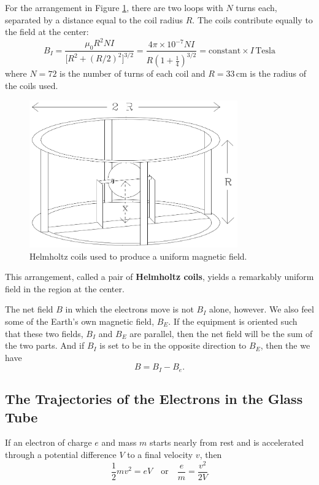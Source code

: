 For the arrangement in Figure {\ref{fig:coils}}, there are two loops with $N$ turns each, separated by a distance equal to the coil radius $R$. The coils contribute equally to the field at the center:
\begin{equation}
  B_{I}=\frac{\mu_{0}R^2NI}{\big[R^2+(R/2)^2\big]^{3/2}}=\frac{4\pi\times 10^{-7}NI}{R(1+\frac{1}{4})^{3/2}}=\mathrm{constant}\times I\, \mathrm{Tesla}
\label{eq:bi}
\end{equation}
where $N = 72$ is the number of turns of each coil and $R = 33\, \mathrm{cm}$ is the radius of the coils used.\myskip
\begin{figure}[h]
\centering
\includegraphics[width=0.8\textwidth]{./Exp5/pic/image2.png}
\caption{Helmholtz coils used to produce a uniform magnetic field.}
\label{fig:coils}
\end{figure}

This arrangement, called a pair of \textbf{Helmholtz coils}, yields a remarkably uniform field in the region at the center.\myskip

The net field $B$ in which the electrons move is not $B_I$ alone, however. We also feel some of the Earth's own magnetic field, $B_E$. If the equipment is oriented such that these two fields, $B_I$ and $B_E$ are parallel, then the net field will be the sum of the two parts. And if $B_I$ is set to be in the opposite direction to $B_E$, then the we have
\begin{equation}
  B=B_{I}-B_{e}.
\label{eq:b}
\end{equation}

\subsection{The Trajectories of the Electrons in the Glass Tube}
If an electron of charge $e$ and mass $m$ starts nearly from rest and is accelerated through a potential difference $V$ to a final velocity $v$, then
\begin{equation}
  \frac{1}{2}mv^2=eV\quad \mathrm{or}\quad \frac{e}{m}=\frac{v^2}{2V}
\label{eq:ev}
\end{equation}

